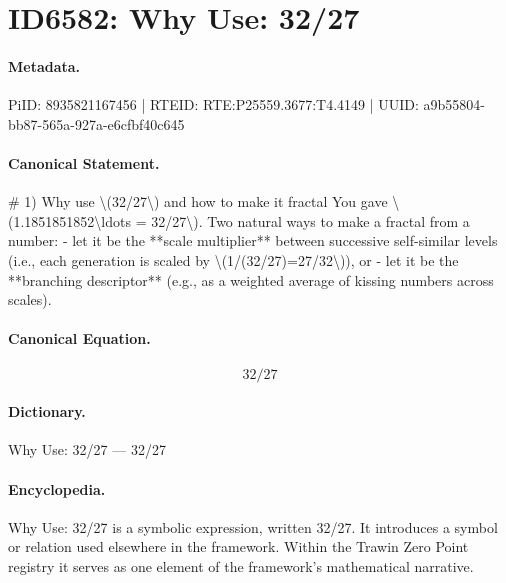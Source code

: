 \section*{ID6582: Why Use: 32/27}
\paragraph{Metadata.}
PiID: 8935821167456 | RTEID: RTE:P25559.3677:T4.4149 | UUID: a9b55804-bb87-565a-927a-e6cfbf40c645

\paragraph{Canonical Statement.}
\# 1) Why use \textbackslash{}(32/27\textbackslash{}) and how to make it fractal You gave \textbackslash{}(1.1851851852\textbackslash{}ldots = 32/27\textbackslash{}). Two natural ways to make a fractal from a number: - let it be the **scale multiplier** between successive self-similar levels (i.e., each generation is scaled by \textbackslash{}(1/(32/27)=27/32\textbackslash{})), or - let it be the **branching descriptor** (e.g., as a weighted average of kissing numbers across scales).

\paragraph{Canonical Equation.}
\[
32/27
\]

\paragraph{Dictionary.}
Why Use: 32/27 — 32/27

\paragraph{Encyclopedia.}
Why Use: 32/27 is a symbolic expression, written 32/27. It introduces a symbol or relation used elsewhere in the framework. Within the Trawin Zero Point registry it serves as one element of the framework's mathematical narrative.
